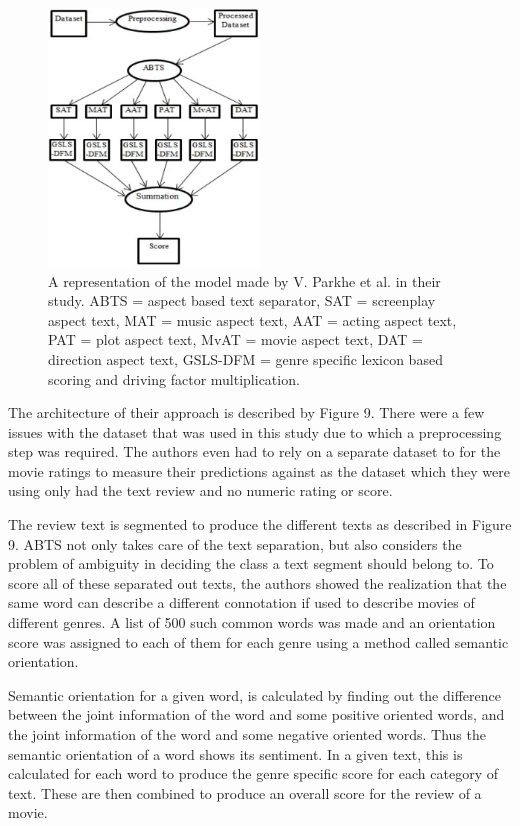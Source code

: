 \documentclass[conference]{IEEEtran}
\begin{document}
\begin{figure}[htbp]
\centerline{\includegraphics[keepaspectratio, width=0.5\textwidth]{pics/9.png}}
\caption{A representation of the model made by V. Parkhe et al. in their study. ABTS = aspect based text separator, SAT = screenplay aspect text, MAT = music aspect text, AAT = acting aspect text, PAT = plot aspect text, MvAT = movie aspect text, DAT = direction aspect text, GSLS-DFM = genre specific lexicon based scoring and driving factor multiplication.}
\label{fig}
\end{figure}

The architecture of their approach is described by Figure 9. There were a few issues with the dataset that was used in this study due to which a preprocessing step was required. The authors even had to rely on a separate dataset to for the movie ratings to measure their predictions against as the dataset which they were using only had the text review and no numeric rating or score.

The review text is segmented to produce the different texts as described in Figure 9. ABTS not only takes care of the text separation, but also considers the problem of ambiguity in deciding the class a text segment should belong to. To score all of these separated out texts, the authors showed the realization that the same word can describe a different connotation if used to describe movies of different genres. A list of 500 such common words was made and an orientation score was assigned to each of them for each genre using a method called semantic orientation.

Semantic orientation for a given word, is calculated by finding out the difference between the joint information of the word and some positive oriented words, and the joint information of the word and some negative oriented words. Thus the semantic orientation of a word shows its sentiment. In a given text, this is calculated for each word to produce the genre specific score for each category of text. These are then combined to produce an overall score for the review of a movie.
\end{document}
